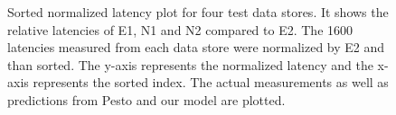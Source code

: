 \begin{figure}
\centering
{}
\caption{Sorted normalized latency plot for four test data stores.
It shows the relative latencies of E1, N1 and N2 compared to E2.
The 1600 latencies measured from each data store were normalized by E2 and than sorted.
The y-axis represents the normalized latency and the x-axis represents the sorted index.
The actual measurements as well as predictions from Pesto and our model are plotted.
}
\label{sortedLatency}
\end{figure}

